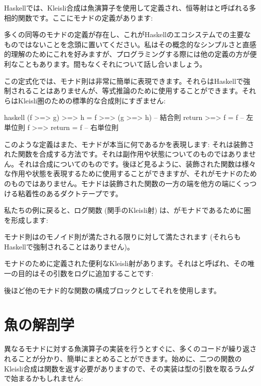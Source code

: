 Haskellでは、Kleisli合成は魚演算子\code{>=>}を使用して定義され、恒等射はと呼ばれる多相的関数です。ここにモナドの定義があります: 

多くの同等のモナドの定義が存在し、これがHaskellのエコシステムでの主要なものではないことを念頭に置いてください。私はその概念的なシンプルさと直感的理解のためにこれを好みますが、プログラミングする際には他の定義の方が便利なこともあります。間もなくそれについて話し合いましょう。

この定式化では、モナド則は非常に簡単に表現できます。それらはHaskellで強制されることはありませんが、等式推論のために使用することができます。それらはKleisli圏のための標準的な合成則にすぎません: 

\begin{snip}{haskell}
(f >=> g) >=> h = f >=> (g >=> h) -- 結合則
return >=> f = f                  -- 左単位則
f >=> return = f                  -- 右単位則
\end{snip}
このような定義はまた、モナドが本当に何であるかを表現します: それは装飾された関数を合成する方法です。それは副作用や状態についてのものではありません。それは合成についてのものです。後ほど見るように、装飾された関数は様々な作用や状態を表現するために使用することができますが、それがモナドのためのものではありません。モナドは装飾された関数の一方の端を他方の端にくっつける粘着性のあるダクトテープです。

私たちの例に戻ると、ログ関数 (関手のKleisli射) は、がモナドであるために圏を形成します: 

モナド則はのモノイド則が満たされる限りに対して満たされます (それらもHaskellで強制されることはありません)。

モナドのために定義された便利なKleisli射があります。それはと呼ばれ、その唯一の目的はその引数をログに追加することです: 

後ほど他のモナド的な関数の構成ブロックとしてそれを使用します。

\section{魚の解剖学}

異なるモナドに対する魚演算子の実装を行うとすぐに、多くのコードが繰り返されることが分かり、簡単にまとめることができます。始めに、二つの関数のKleisli合成は関数を返す必要がありますので、その実装は型の引数を取るラムダで始まるかもしれません: 

